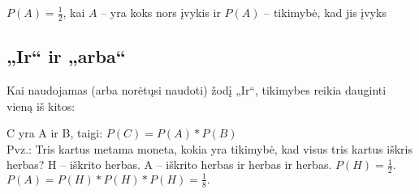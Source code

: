 $P(A) = \frac{1}{2}$, kai $A$ -- yra koks nors įvykis ir $P(A)$ -- tikimybė, kad jis įvyks

\subsection{„Ir“ ir „arba“}

Kai naudojamas (arba norėtųsi naudoti) žodį „Ir“, tikimybes reikia dauginti vieną iš kitos:

C yra A ir B, taigi: $P(C) = P(A) * P(B)$ 
\\
Pvz.: Tris kartus metama moneta, kokia yra tikimybė, kad visus tris kartus iškris herbas?
H -- iškrito herbas. A -- iškrito herbas ir herbas ir herbas. $P(H) = \frac{1}{2}$. $P(A) = P(H)*P(H)*P(H) = \frac{1}{8}.$
